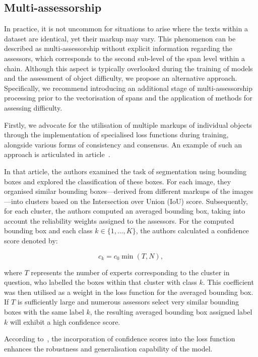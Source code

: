 \documentclass{article}
\begin{document}
\subsection{Multi-assessorship}\label{multi-assessor}
In practice, it is not uncommon for situations to arise where the texts within a dataset are identical, yet their markup may vary. This phenomenon can be described as multi-assessorship without explicit information regarding the assessors, which corresponds to the second sub-level of the span level within a chain. Although this aspect is typically overlooked during the training of models and the assessment of object difficulty, we propose an alternative approach. Specifically, we recommend introducing an additional stage of multi-assessorship processing prior to the vectorisation of spans and the application of methods for assessing difficulty.

Firstly, we advocate for the utilisation of multiple markups of individual objects through the implementation of specialised loss functions during training, alongside various forms of consistency and consensus. An example of such an approach is articulated in article~\cite{le2023learning}.

In that article, the authors examined the task of segmentation using bounding boxes and explored the classification of these boxes. For each image, they organised similar bounding boxes—derived from different markups of the images—into clusters based on the Intersection over Union (IoU) score. Subsequently, for each cluster, the authors computed an averaged bounding box, taking into account the reliability weights assigned to the assessors. For the computed bounding box and each class \( k \in \{1, \ldots, K\} \), the authors calculated a confidence score denoted by:

\[
c_k = c_0 \min(T, N),
\]

where \( T \) represents the number of experts corresponding to the cluster in question, who labelled the boxes within that cluster with class \( k \). This coefficient was then utilised as a weight in the loss function for the averaged bounding box. If \( T \) is sufficiently large and numerous assessors select very similar bounding boxes with the same label \( k \), the resulting averaged bounding box assigned label \( k \) will exhibit a high confidence score.

According to~\cite{le2023learning}, the incorporation of confidence scores into the loss function enhances the robustness and generalisation capability of the model. 
\end{document}
